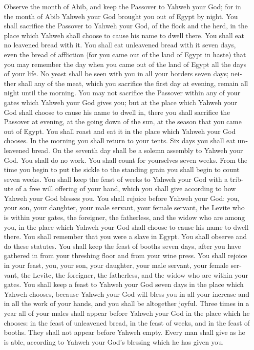 \begin{paracol}{2}
\begin{otherlanguage}{english}
 Observe the month of Abib, and keep the Passover to
Yahweh your God; for in the month of Abib Yahweh your God brought you
out of Egypt by night.  You shall sacrifice the Passover
to Yahweh your God, of the flock and the herd, in the place which Yahweh
shall choose to cause his name to dwell there.  You shall
eat no leavened bread with it. You shall eat unleavened bread with it
seven days, even the bread of affliction (for you came out of the land
of Egypt in haste) that you may remember the day when you came out of
the land of Egypt all the days of your life.  No yeast
shall be seen with you in all your borders seven days; neither shall any
of the meat, which you sacrifice the first day at evening, remain all
night until the morning.  You may not sacrifice the
Passover within any of your gates which Yahweh your God gives you;
 but at the place which Yahweh your God shall choose to
cause his name to dwell in, there you shall sacrifice the Passover at
evening, at the going down of the sun, at the season that you came out
of Egypt.  You shall roast and eat it in the place which
Yahweh your God chooses. In the morning you shall return to your tents.
 Six days you shall eat unleavened bread. On the seventh
day shall be a solemn assembly to Yahweh your God. You shall do no work.
 You shall count for yourselves seven weeks. From the time
you begin to put the sickle to the standing grain you shall begin to
count seven weeks.  You shall keep the feast of weeks to
Yahweh your God with a tribute of a free will offering of your hand,
which you shall give according to how Yahweh your God blesses you.
 You shall rejoice before Yahweh your God: you, your son,
your daughter, your male servant, your female servant, the Levite who is
within your gates, the foreigner, the fatherless, and the widow who are
among you, in the place which Yahweh your God shall choose to cause his
name to dwell there.  You shall remember that you were a
slave in Egypt. You shall observe and do these statutes. 
You shall keep the feast of booths seven days, after you have gathered
in from your threshing floor and from your wine press. 
You shall rejoice in your feast, you, your son, your daughter, your male
servant, your female servant, the Levite, the foreigner, the fatherless,
and the widow who are within your gates.  You shall keep
a feast to Yahweh your God seven days in the place which Yahweh chooses,
because Yahweh your God will bless you in all your increase and in all
the work of your hands, and you shall be altogether joyful.
 Three times in a year all of your males shall appear
before Yahweh your God in the place which he chooses: in the feast of
unleavened bread, in the feast of weeks, and in the feast of booths.
They shall not appear before Yahweh empty.  Every man
shall give as he is able, according to Yahweh your God's blessing which
he has given you.


\end{otherlanguage}
\end{paracol}

